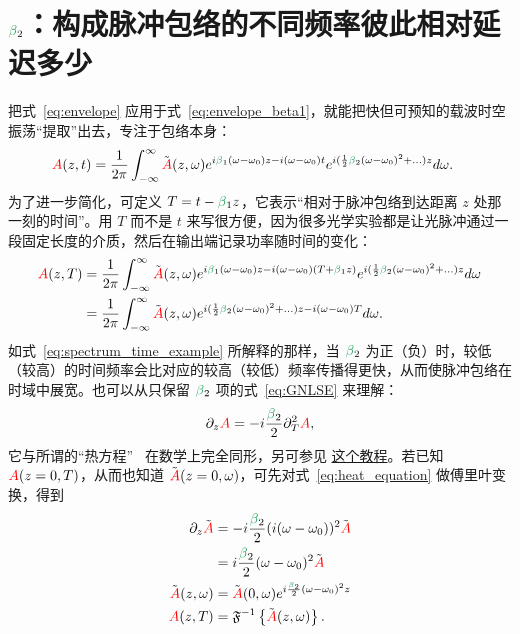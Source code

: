 \section[beta2：不同频率的相对延迟]{$\betag_2$：构成脉冲包络的不同频率彼此相对延迟多少}
\label{sec:GVD}
把式~\ref{eq:envelope} 应用于式~\ref{eq:envelope_beta1}，就能把快但可预知的载波时空振荡“提取”出去，专注于包络本身：
\begin{align}
    \A(z,t)  &= \frac{1}{2\pi}  \int_{-\infty}^{\infty} \Tilde{\A}(z,\omega) e^{i\betag_1(\omega-\omega_0)z-i(\omega-\omega_0) t} e^{i(\frac{1}{2}\betag_2(\omega-\omega_0)^2+...)z} d\omega.
\end{align}
为了进一步简化，可定义 $T=t-\betag_1z$，它表示“相对于脉冲包络到达距离 $z$ 处那一刻的时间”。用 $T$ 而不是 $t$ 来写很方便，因为很多光学实验都是让光脉冲通过一段固定长度的介质，然后在输出端记录功率随时间的变化：
\begin{align}
    \A(z,T)  &= \frac{1}{2\pi}  \int_{-\infty}^{\infty} \Tilde{\A}(z,\omega) e^{i\betag_1(\omega-\omega_0)z-i(\omega-\omega_0) (T+\betag_1z)} e^{i(\frac{1}{2}\betag_2(\omega-\omega_0)^2+...)z} d\omega \\ \nonumber
    &= \frac{1}{2\pi}  \int_{-\infty}^{\infty} \Tilde{\A}(z,\omega) e^{i(\frac{1}{2}\betag_2(\omega-\omega_0)^2+...)z-i(\omega-\omega_0)T} d\omega.
\end{align}
如式~\ref{eq:spectrum_time_example} 所解释的那样，当 $\betag_2$ 为正（负）时，较低（较高）的时间频率会比对应的较高（较低）频率传播得更快，从而使脉冲包络在时域中展宽。也可以从只保留 $\betag_2$ 项的式~\ref{eq:GNLSE} 来理解：
\begin{align}
    \label{eq:heat_equation}
    \partial_z \A = -i  \frac{\betag_2}{2}\partial_T^2\A,
\end{align}
它与所谓的“热方程”~\cite{Fourier_heat_original,Fourier_heat_english} 在数学上完全同形，另可参见 \href{https://digitalcommons.ursinus.edu/cgi/viewcontent.cgi?article=1008&context=triumphs_differ}{这个教程}。若已知 $\textcolor{red}{A}(z=0,T)$，从而也知道 $\tilde{\textcolor{red}{A}}(z=0,\omega)$，可先对式~\ref{eq:heat_equation} 做傅里叶变换，得到
\begin{align}
    \label{eq:beta2_broadening}
    \partial_z \Tilde{\A} &= -i  \frac{\betag_2}{2} (i(\omega-\omega_0))^2 \Tilde{\A} \\ \nonumber
    &= i  \frac{\betag_2}{2}(\omega-\omega_0)^2\Tilde{\A} \\ \nonumber
    \Tilde{\A}(z,\omega)&=\Tilde{\A}(0,\omega)e^{i\frac{\betag_2}{2}(\omega-\omega_0)^2z} \\ \nonumber
    \A(z,T) &= \IFT\left\{  \Tilde{\A}(z,\omega)   \right\}.
\end{align}
